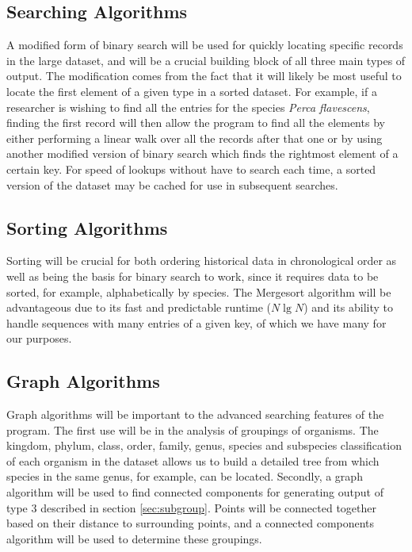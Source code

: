 \documentclass{article}
\begin{document}
\subsection{Searching Algorithms}
A modified form of binary search will be used for quickly locating specific records in the large dataset, and will be a crucial building block of all three main types of output. The modification comes from the fact that it will likely be most useful to locate the first element of a given type in a sorted dataset. For example, if a researcher is wishing to find all the entries for the species \textit{Perca flavescens}, finding the first record will then allow the program to find all the elements by either performing a linear walk over all the records after that one or by using another modified version of binary search which finds the rightmost element of a certain key. For speed of lookups without have to search each time, a sorted version of the dataset may be cached for use in subsequent searches.

\subsection{Sorting Algorithms}
Sorting will be crucial for both ordering historical data in chronological order as well as being the basis for binary search to work, since it requires data to be sorted, for example, alphabetically by species. The Mergesort algorithm will be advantageous due to its fast and predictable runtime ($N\lg N$) and its ability to handle sequences with many entries of a given key, of which we have many for our purposes.

\subsection{Graph Algorithms}\label{sec:graphalgs}
Graph algorithms will be important to the advanced searching features of the program. The first use will be in the analysis of groupings of organisms. The kingdom, phylum, class, order, family, genus, species and subspecies classification of each organism in the dataset allows us to build a detailed tree from which species in the same genus, for example, can be located. Secondly, a graph algorithm will be used to find connected components for generating output of type 3 described in section \ref{sec:subgroup}. Points will be connected together based on their distance to surrounding points, and a connected components algorithm will be used to determine these groupings.
\end{document}
